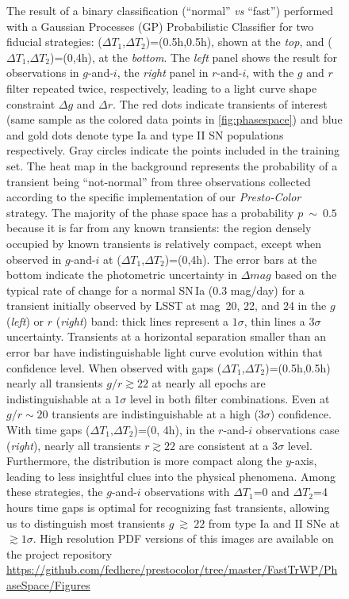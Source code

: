 \documentclass[letterpaper,longauthor,trackchanges,twocolumn,onecolappendix,sort&compress]{aastex62}
\newcommand{\dtone}{\ensuremath{\Delta T_1}}
\newcommand{\dttwo}{\ensuremath{\Delta T_2}}
\begin{document}
\begin{figure}[!t]
\begin{center}
\caption{{The result of a binary classification (``normal'' \emph{vs} ``fast'') performed with a Gaussian Processes (GP)  Probabilistic Classifier for two fiducial strategies: (\dtone,\dttwo)=(0.5h,0.5h), shown at the \emph{top}, and (\dtone,\dttwo)=(0,4h), at the \emph{bottom}. The \emph{left} panel shows the result for observations in $g$-and-$i$, the \emph{right} panel in $r$-and-$i$, with the $g$ and $r$ filter repeated twice, respectively,  leading to a light curve shape constraint $\Delta g$ and $\Delta r$. The red dots indicate transients of interest (same sample as the colored data points in \autoref{fig:phasespace}) and blue and gold dots denote type Ia and type II SN populations respectively. Gray circles indicate the points included in the training set. The heat map in the background represents the probability of a transient being ``not-normal'' from three observations collected according to the specific implementation of our \emph{Presto-Color}  strategy. The majority of the phase space has a probability $p~\sim~0.5$ because it is far from any known transients: the region densely occupied by known transients is relatively compact, except when observed in $g$-and-$i$ at (\dtone,\dttwo)=(0,4h). The error bars at the bottom indicate the photometric uncertainty in $\Delta mag$ based on the typical rate of change for a normal SN\,Ia (0.3 mag/day) for a transient initially observed by LSST at mag~20, 22, and 24 in the $g$ (\emph{left}) or $r$ (\emph{right}) band: thick lines represent a $1\sigma$, thin lines a $3\sigma$ uncertainty. Transients at a horizontal separation smaller than an error bar have indistinguishable light curve evolution within that confidence level. When observed with gaps (\dtone,\dttwo)=(0.5h,0.5h) nearly all transients  $g/r\gtrsim22$ at nearly all epochs are indistinguishable at a $1\sigma$ level in both filter combinations. Even at $g/r\sim20$ transients are indistinguishable at a high ($3\sigma$) confidence.
With time gaps (\dtone,\dttwo)=(0, 4h), in the $r$-and-$i$ observations case (\emph{right}), 
nearly all transients $r\gtrsim22$ are consistent at a $3\sigma$  level. Furthermore, the distribution is more compact along the $y$-axis, leading to less insightful clues into the physical phenomena. Among these strategies, the $g$-and-$i$ observations with \dtone=0 and \dttwo=4 hours time gaps is optimal for recognizing fast transients, allowing us to distinguish most transients  $g~\gtrsim~22$  from type Ia and II SNe at $\gtrsim1\sigma$. High resolution PDF versions of this images are available on the project repository \url{https://github.com/fedhere/prestocolor/tree/master/FastTrWP/PhaseSpace/Figures}}}\label{fig:classifier}
\end{center}\end{figure}
\end{document}
